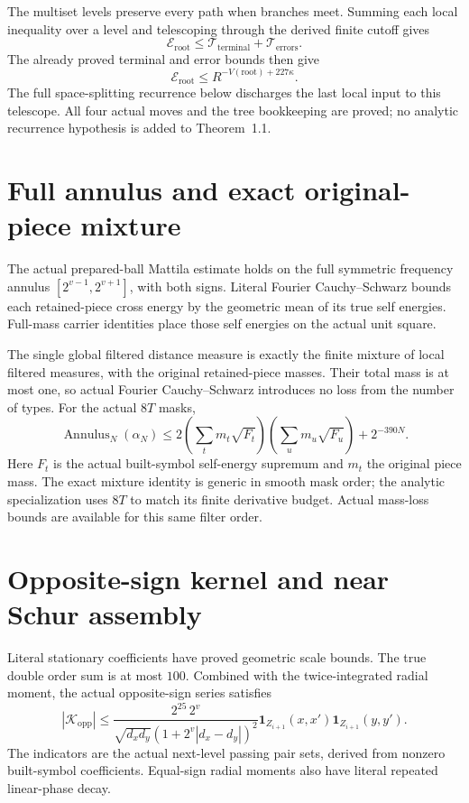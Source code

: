 \documentclass[11pt]{article}
\begin{document}
The multiset levels preserve every path when branches meet. Summing each
local inequality over a level and telescoping through the derived finite
cutoff gives
\[
\mathcal E_{\mathrm{root}}\le
\mathcal T_{\mathrm{terminal}}+\mathcal T_{\mathrm{errors}}.
\]
The already proved terminal and error bounds then give
\[
\mathcal E_{\mathrm{root}}\le R^{-V(\mathrm{root})+227\kappa}.
\]
The full space-splitting recurrence below discharges the last local input to
this telescope. All four actual moves and the tree bookkeeping are proved;
no analytic recurrence hypothesis is added to Theorem~1.1.

\newpage
\section*{Full annulus and exact original-piece mixture}
The actual prepared-ball Mattila estimate holds on the full symmetric
frequency annulus $[2^{v-1},2^{v+1}]$, with both signs. Literal Fourier
Cauchy--Schwarz bounds each retained-piece cross energy by the geometric mean
of its true self energies. Full-mass carrier identities place those self
energies on the actual unit square.

The single global filtered distance measure is exactly the finite mixture of
local filtered measures, with the original retained-piece masses. Their total
mass is at most one, so actual Fourier Cauchy--Schwarz introduces no loss from
the number of types. For the actual $8T$ masks,
\[
\operatorname{Annulus}_N(\alpha_N)\le
2\left(\sum_t m_t\sqrt{F_t}\right)
\left(\sum_u m_u\sqrt{F_u}\right)+2^{-390N}.
\]
Here $F_t$ is the actual built-symbol self-energy supremum and $m_t$ the
original piece mass. The exact mixture identity is generic in smooth mask
order; the analytic specialization uses $8T$ to match its finite derivative
budget. Actual mass-loss bounds are available for this same filter order.

\newpage
\section*{Opposite-sign kernel and near Schur assembly}
Literal stationary coefficients have proved geometric scale bounds. The
true double order sum is at most $100$. Combined with the twice-integrated
radial moment, the actual opposite-sign series satisfies
\[
|\mathcal K_{\mathrm{opp}}|\le
\frac{2^{25}\,2^v}{\sqrt{d_xd_y}(1+2^v|d_x-d_y|)^2}
\mathbf1_{Z_{i+1}}(x,x')\mathbf1_{Z_{i+1}}(y,y').
\]
The indicators are the actual next-level passing pair sets, derived from
nonzero built-symbol coefficients. Equal-sign radial moments also have
literal repeated linear-phase decay.
\end{document}
